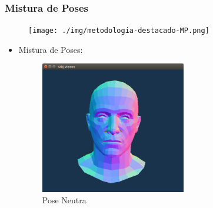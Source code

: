 \documentclass[brazil]{beamer}
\begin{document}
\begin{frame}
\frametitle{Mistura de Poses}
        \begin{figure}
            \centering
            \texttt{[image: ./img/metodologia-destacado-MP.png]}
      \end{figure}
\end{frame}



\begin{frame}
  \begin{itemize}
  \item Mistura de Poses:
  \begin{figure}
\centering
\includegraphics[width = 0.6\textwidth, keepaspectratio]{./img/rosto-neutro.png}
        \caption{Pose Neutra}
     \end{figure}         
  \end{itemize} 
\end{frame}
\end{document}

